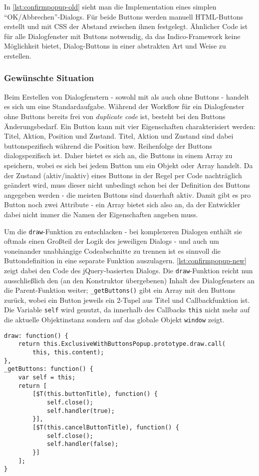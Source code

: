 In \autoref{lst:confirmpopup-old} sieht man die Implementation eines simplen
\enquote{OK/Abbrechen}-Dialogs. Für beide Buttons werden manuell HTML-Buttons erstellt und mit CSS
der Abstand zwischen ihnen festgelegt. Ähnlicher Code ist für alle Dialogfenster mit Buttons
notwendig, da das Indico-Framework keine Möglichkeit bietet, Dialog-Buttons in einer abstrakten Art
und Weise zu erstellen.

\subsubsection{Gewünschte Situation}

Beim Erstellen von Dialogfenstern - sowohl mit als auch ohne Buttons - handelt es sich um eine
Standardaufgabe. Während der Workflow für ein Dialogfenster ohne Buttons bereits frei von
\emph{duplicate code} ist, besteht bei den Buttons Änderungsbedarf. Ein Button kann mit vier
Eigenschaften charakterisiert werden: Titel, Aktion, Position und Zustand. Titel, Aktion und Zustand
sind dabei buttonspezifisch während die Position bzw. Reihenfolge der Buttons dialogspezifisch ist.
Daher bietet es sich an, die Buttons in einem Array zu speichern, wobei es sich bei jedem Button um
ein Objekt oder Array handelt. Da der Zustand (aktiv/inaktiv) eines Buttons in der Regel per Code
nachträglich geändert wird, muss dieser nicht unbedingt schon bei der Definition des Buttons
angegeben werden - die meisten Buttons sind dauerhaft aktiv. Damit gibt es pro Button noch zwei
Attribute - ein Array bietet sich also an, da der Entwickler dabei nicht immer die Namen der
Eigenschaften angeben muss.

Um die \lstinline{draw}-Funktion zu entschlacken - bei komplexeren Dialogen enthält sie oftmals
einen Großteil der Logik des jeweiligen Dialogs - und auch um voneinander unabhängige Codeabschnitte
zu trennen ist es sinnvoll die Buttondefinition in eine separate Funktion auszulagern.
\autoref{lst:confirmpopup-new} zeigt dabei den Code des jQuery-basierten Dialogs. Die
\lstinline{draw}-Funktion reicht nun ausschließlich den (an den Konstruktor übergebenen) Inhalt des
Dialogfensters an die Parent-Funktion weiter; \lstinline{_getButtons()} gibt ein Array mit den
Buttons zurück, wobei ein Button jeweils ein 2-Tupel aus Titel und Callbackfunktion ist. Die Variable
\lstinline{self} wird genutzt, da innerhalb des Callbacks \lstinline{this} nicht mehr auf die
aktuelle Objektinstanz sondern auf das globale Objekt \lstinline{window} zeigt.


\begin{lstlisting}[label=lst:confirmpopup-new,caption=jQuery-Code zum Erstellen eines simplen Dialogfensters]
draw: function() {
    return this.ExclusiveWithButtonsPopup.prototype.draw.call(
        this, this.content);
},
_getButtons: function() {
    var self = this;
    return [
        [$T(this.buttonTitle), function() {
            self.close();
            self.handler(true);
        }],
        [$T(this.cancelButtonTitle), function() {
            self.close();
            self.handler(false);
        }]
    ];
}
\end{lstlisting}

